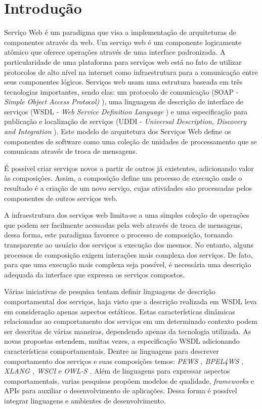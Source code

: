 \chapter{Introdução}
\label{cap:introduction}  
 
Serviço Web é um paradigma que visa a implementação de arquiteturas de
componentes através da web. Um serviço web é um componente logicamente atômico
que oferece operações através de uma interface padronizada. A particularidade
de uma plataforma para serviços web está no fato de utilizar protocolos de alto
nível na internet como infraestrutura para a comunicação entre seus componentes
lógicos. Serviços web usam uma estrutura baseada em três tecnologias
 importantes, sendo elas: um protocolo de comunicação (SOAP - \textit{Simple Object Access Protocol)}
 \cite{soap}), uma linguagem de descrição de interface de serviços (WSDL -
 \textit{Web Service Definition Language} \cite{wsdl}) e uma especificação para
 publicação e localização de serviços (UDDI - \textit{Universal Description,
 Discovery and Integration} \cite{uddi}). Este modelo de arquitetura dos
 Serviços Web define os componentes de software como uma coleção de unidades de
 processamento que se comunicam através de troca de mensagens.
   
 É possível criar serviços
  novos a partir de outros já existentes, adicionando valor às composições.
  Assim, a composição define um processo de execução onde o resultado é a
  criação de um novo serviço, cujas atividades são processadas pelos
  componentes de outros serviços web.

A infraestrutura dos serviços web limita-se a uma simples coleção de operações
que podem ser facilmente acessadas pela web através de troca de mensagens,
dessa forma, este paradigma favorece o processo de composição, tornando
transparente ao usuário dos serviços a execução dos mesmos. No entanto, alguns
processos de composição exigem interações mais complexa dos
serviços. De fato, para que uma execução mais complexa seja possível, é
necessária uma descrição adequada da interface que expressa os serviços
compostos.
 
Várias iniciativas de pesquisa tentam definir linguagens de descrição
comportamental dos serviços, haja visto que a descrição realizada em WSDL leva
em consideração apenas aspectos estáticos. Estas
características dinâmicas relacionadas ao comportamento dos serviços em um
determinado contexto podem ser descritas de várias maneiras,
dependendo apenas da tecnologia utilizada. As novas propostas estendem, muitas
vezes, a especificação WSDL adicionando características comportamentais. Dentre
as linguagens para descrever comportamento dos serviços e suas composições
temos: \textit{PEWS \cite{BaCAM05}, BPEL4WS \cite{bpel03}, XLANG \cite{xlang},
WSCI \cite{wsci}} e \textit{OWL-S \cite{owl04}}. Além de linguagens para
expressar aspectos comportamentais, varias pesquisas propõem modelos de
qualidade, \textit{frameworks} e APIs para auxiliar o desenvolvimento de
aplicações. Dessa forma é possível integrar linguagens e ambientes de desenvolvimento.
     
